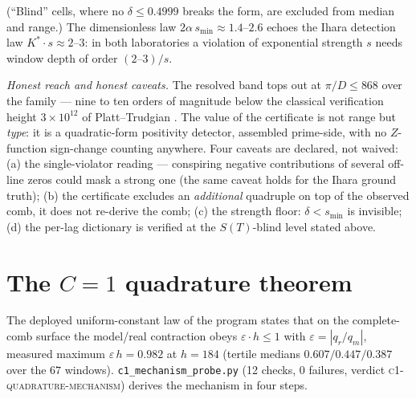 \documentclass[11pt,a4paper]{article}
\theoremstyle{remark}
\newcommand{\eps}{\varepsilon}
\begin{document}
\noindent (``Blind'' cells, where no $\delta\le0.4999$ breaks the form,
are excluded from median and range.)  The dimensionless law
$2\alpha\,s_{\min}\approx1.4$--$2.6$ echoes the Ihara detection law
$K^*\!\cdot s\approx2$--$3$: in both laboratories a violation of
exponential strength $s$ needs window depth of order $(2\text{--}3)/s$.

\emph{Honest reach and honest caveats.}  The resolved band tops out at
$\pi/D\le868$ over the family --- nine to ten orders of magnitude below
the classical verification height $3\times10^{12}$ of Platt--Trudgian
\cite{PT21}.  The value of the certificate is not range but
\emph{type}: it is a quadratic-form positivity detector, assembled
prime-side, with no $Z$-function sign-change counting anywhere.  Four
caveats are declared, not waived: (a) the single-violator reading ---
conspiring negative contributions of several off-line zeros could mask
a strong one (the same caveat holds for the Ihara ground truth); (b)
the certificate excludes an \emph{additional} quadruple on top of the
observed comb, it does not re-derive the comb; (c) the strength floor:
$\delta<s_{\min}$ is invisible; (d) the per-lag dictionary is verified
at the $S(T)$-blind level stated above.

\section{The $C=1$ quadrature theorem}\label{sec:c1}

The deployed uniform-constant law of the program states that on the
complete-comb surface the model/real contraction obeys
$\eps\cdot h\le1$ with $\eps=|q_r/q_m|$, measured maximum
$\eps\,h=0.982$ at $h=184$ (tertile medians $0.607/0.447/0.387$ over
the $67$ windows).  \texttt{c1\_mechanism\_probe.py} (12 checks, 0
failures, verdict \textsc{c1-quadrature-mechanism}) derives the
mechanism in four steps.
\end{document}
